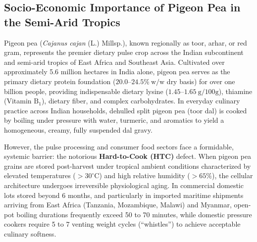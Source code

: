 \documentclass[10pt,a4paper]{article}
\begin{document}
\subsection{Socio-Economic Importance of Pigeon Pea in the Semi-Arid Tropics}
Pigeon pea (\textit{Cajanus cajan} (L.) Millsp.), known regionally as toor, arhar, or red gram, represents the premier dietary pulse crop across the Indian subcontinent and semi-arid tropics of East Africa and Southeast Asia. Cultivated over approximately 5.6 million hectares in India alone, pigeon pea serves as the primary dietary protein foundation ($20.0\text{--}24.5\%\ \mathrm{w/w}$ dry basis) for over one billion people, providing indispensable dietary lysine ($1.45\text{--}1.65\ \mathrm{g/100g}$), thiamine (Vitamin $\mathrm{B}_1$), dietary fiber, and complex carbohydrates. In everyday culinary practice across Indian households, dehulled split pigeon pea (toor dal) is cooked by boiling under pressure with water, turmeric, and aromatics to yield a homogeneous, creamy, fully suspended dal gravy.

However, the pulse processing and consumer food sectors face a formidable, systemic barrier: the notorious \textbf{Hard-to-Cook (HTC)} defect. When pigeon pea grains are stored post-harvest under tropical ambient conditions characterized by elevated temperatures ($> 30^\circ\mathrm{C}$) and high relative humidity ($> 65\%$), the cellular architecture undergoes irreversible physiological aging. In commercial domestic lots stored beyond 6 months, and particularly in imported maritime shipments arriving from East Africa (Tanzania, Mozambique, Malawi) and Myanmar, open-pot boiling durations frequently exceed 50 to 70 minutes, while domestic pressure cookers require 5 to 7 venting weight cycles (``whistles'') to achieve acceptable culinary softness.
\end{document}
